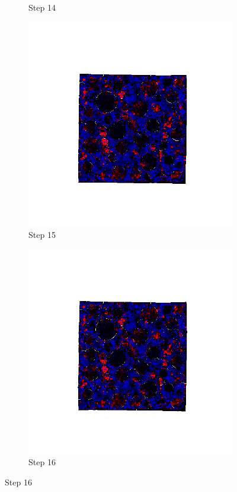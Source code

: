 \begin{figure}[ht!]
\begin{subfigure}{.25\textwidth}
      \caption{Step 14}
      \end{subfigure}%
      \begin{subfigure}{.25\textwidth}
        \centering
        \includegraphics[width=1.0\linewidth]{Files/A30P75_3_IS/DEP50-STEP(015).png}
      \caption{Step 15}
      \end{subfigure}%
      \begin{subfigure}{.25\textwidth}
        \centering
        \includegraphics[width=1.0\linewidth]{Files/A30P75_3_IS/DEP50-STEP(016).png}
      \caption{Step 16}
      \end{subfigure}


\end{figure}
